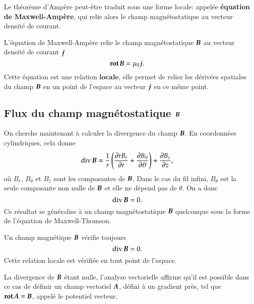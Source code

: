 Le théorème d'Ampère peut-être traduit sous une forme locale:
appelée \textbf{équation de Maxwell-Ampère}, qui relie alors le champ magnétostatique
au vecteur densité de courant.

\begin{defn}
	L'équation de Maxwell-Ampère relie le champ magnétostatique $\vecb$
	au vecteur densité de courant $\vecj$
	\begin{equation}
		\rot \vecb = \mu_0 \vecj.
		\label{eq:magneto_ma}
	\end{equation}
	Cette équation est une relation $\textbf{locale}$, elle permet de relier 
	les dérivées spatiales du champ $\vecb$ en un point de l'espace au vecteur
	$\vecj$ en ce même point.
\end{defn}

\subsection{Flux du champ magnétostatique $\vecb$}
On cherche maintenant à calculer la divergence du champ $\vecb$. En coordonnées 
cylindriques, cela donne
\begin{equation*}
	\div \vecb = \dfrac{1}{r}\left(\dd{r B_r}{r} + \dd{B_\theta}{\theta} \right)
	+ \dd{B_z}{z},
\end{equation*}
où $B_r$, $B_\theta$ et $B_z$ sont les composantes de $\vecb$. 
Dans le cas du fil infini, $B_\theta$ est la seule composante non nulle de $\vecb$ 
et elle ne dépend pas
de $\theta$. On a donc
\begin{equation*}
	\div \vecb = 0.
\end{equation*}
Ce résultat se généralise à un champ magnétostatique $\vecb$ quelconque sous
la forme de l'équation de Maxwell-Thomson.

\begin{defn}
	Un champ magnétique $\vecb$ vérifie toujours
	\begin{equation*}
		\div \vecb = 0.
	\end{equation*}
	Cette relation locale est vérifiée en tout point de l'espace.
\end{defn}

\begin{rem}
La divergence de $\vecb$ étant nulle, l'analyse vectorielle affirme
qu'il est possible dans ce cas de définir un champ vectoriel $\veca$,
défini à un gradient près, tel que $\rot \veca = \vecb$,
appelé le potentiel vecteur.
\end{rem}

